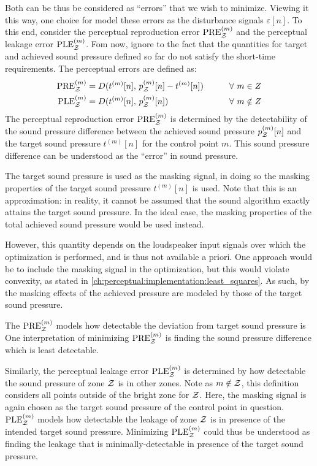 Both can be thus be considered as ``errors'' that we wish to minimize.
Viewing it this way, one choice for model these errors as the disturbance signals $\varepsilon[n]$.
To this end, consider the perceptual reproduction error $\text{PRE}^{(m)}_{\mathcal{Z}}$ and the perceptual leakage error $\text{PLE}^{(m)}_{\mathcal{Z}}$.
Fom now, ignore to the fact that the quantities for target and achieved sound pressure defined so far do not satisfy the short-time requirements. 
The perceptual errors are defined as: 
\begin{alignat}{2}
    \text{PRE}^{(m)}_{\mathcal{Z}} &= D(t^{(m)}[n],\,p_{\mathcal{Z}}^{(m)}[n] - t^{(m)}[n]) \qquad&& \forall\,\, m\in Z \label{eq:sound_zone:approach_selection:PRE}\\
    \text{PLE}^{(m)}_{\mathcal{Z}} &= D(t^{(m)}[n],\,p_{\mathcal{Z}}^{(m)}[n]) \qquad&& \forall\,\, m\notin Z \label{eq:sound_zone:approach_selection:PLE} 
\end{alignat}
The perceptual reproduction error $\text{PRE}^{(m)}_{\mathcal{Z}}$ is determined by the detectability of the sound pressure difference between the achieved sound
pressure $p_{\mathcal{Z}}^{(m)}[n]$ and the target sound pressure $t^{(m)}[n]$ for the control point $m$.
This sound pressure difference can be understood as the ``error'' in sound pressure.

The target sound pressure is used as the masking signal, in doing so the masking properties of the target sound pressure $t^{(m)}[n]$ is used.
Note that this is an approximation: in reality, it cannot be assumed that the sound algorithm exactly attains the target sound pressure.
In the ideal case, the masking properties of the total achieved sound pressure would be used instead.

However, this quantity depends on the loudspeaker input signals over which the optimization is performed, and is thus not available a priori. 
One approach would be to include the masking signal in the optimization, but this would violate convexity, as stated in 
\autoref{ch:perceptual:implementation:least_squares}.
As such, by the masking effects of the achieved pressure are modeled by those of the target sound pressure.

The $\text{PRE}^{(m)}_{\mathcal{Z}}$ models how detectable the deviation from target sound pressure is
One interpretation of minimizing $\text{PRE}^{(m)}_{\mathcal{Z}}$ is finding the sound pressure difference which is least detectable. 

Similarly, the perceptual leakage error $\text{PLE}^{(m)}_{\mathcal{Z}}$ is determined by how detectable the sound pressure of zone $\mathcal{Z}$ is in other zones.
Note as $m\notin\mathcal{Z}$, this definition considers all points outside of the bright zone for $\mathcal{Z}$.  
Here, the masking signal is again chosen as the target sound pressure of the control point in question.
$\text{PLE}^{(m)}_{\mathcal{Z}}$ models how detectable the leakage of zone $\mathcal{Z}$ is in presence of the intended target sound pressure. 
Minimizing $\text{PLE}^{(m)}_{\mathcal{Z}}$ could thus be understood as finding the leakage that is minimally-detectable in presence of the target sound pressure.


